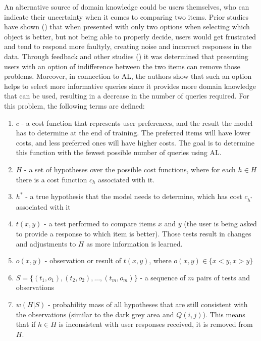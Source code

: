 \documentclass[
  letterpaper,
  numbers=noenddot,
  DIV=11]{scrreprt}
\theoremstyle{plain}
\theoremstyle{definition}
\theoremstyle{remark}
\begin{document}
An alternative source of domain knowledge could be users themselves, who
can indicate their uncertainty when it comes to comparing two items.
Prior studies have shown () that when presented with only two options when selecting which
object is better, but not being able to properly decide, users would get
frustrated and tend to respond more faultyly, creating noise and
incorrect responses in the data. Through feedback and other studies
() it was
determined that presenting users with an option of indifference between
the two items can remove those problems. Moreover, in connection to AL,
the authors show that such an option helps to select more informative
queries since it provides more domain knowledge that can be used,
resulting in a decrease in the number of queries required. For this
problem, the following terms are defined:

\begin{enumerate}
\def\labelenumi{\arabic{enumi}.}
\item
  \(c\) - a cost function that represents user preferences, and the
  result the model has to determine at the end of training. The
  preferred items will have lower costs, and less preferred ones will
  have higher costs. The goal is to determine this function with the
  fewest possible number of queries using AL.
\item
  \(H\) - a set of hypotheses over the possible cost functions, where
  for each \(h \in H\) there is a cost function \(c_h\) associated with
  it.
\item
  \(h^*\) - a true hypothesis that the model needs to determine, which
  has cost \(c_{h^*}\) associated with it
\item
  \(t(x,y)\) - a test performed to compare items \(x\) and \(y\) (the
  user is being asked to provide a response to which item is better).
  Those tests result in changes and adjustments to \(H\) as more
  information is learned.
\item
  \(o(x,y)\) - observation or result of \(t(x,y)\), where
  \(o(x,y) \in \{x<y, x>y\}\)
\item
  \(S = \{(t_1, o_1), (t_2, o_2),...,(t_m, o_m)\}\) - a sequence of
  \(m\) pairs of tests and observations
\item
  \(w(H|S)\) - probability mass of all hypotheses that are still
  consistent with the observations (similar to the dark grey area and
  \(Q(i,j)\)). This means that if \(h \in H\) is inconsistent with user
  responses received, it is removed from \(H\).
\end{enumerate}
\end{document}
